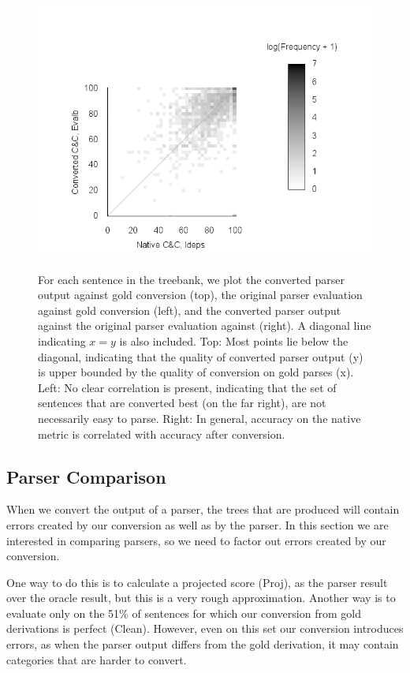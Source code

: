 \begin{figure}
{    \hfill
    \includegraphics[trim={15mm 0 65mm 40mm},clip]{figures/heat-both}
  }
	\caption[Heatmaps comparing gold conversion accuracy, \ccg native evaluation, and converted evaluation.]{ \label{fig:scatter_plots}
		For each sentence in the treebank, we plot the converted parser output against gold conversion (top), the original parser evaluation against gold conversion (left), and the converted parser output against the original parser evaluation against (right).
		A diagonal line indicating $x=y$ is also included.
		Top: Most points lie below the diagonal, indicating that the quality of converted parser output (y) is upper bounded by the quality of conversion on gold parses (x).
		Left: No clear correlation is present, indicating that the set of sentences that are converted best (on the far right), are not necessarily easy to parse.
		Right: In general, accuracy on the native metric is correlated with accuracy after conversion.
	}
\end{figure}

\subsection{Parser Comparison}

When we convert the output of a \ccg parser, the \ptb trees that are produced
will contain errors created by our conversion as well as by the parser. In this
section we are interested in comparing parsers, so we need to factor out errors
created by our conversion.

One way to do this is to calculate a projected score (Proj), as the
parser result over the oracle result, but this is a very rough approximation.
Another way is to evaluate only on the 51\% of sentences for which our
conversion from gold \ccg derivations is perfect (Clean).  However,
even on this set our conversion introduces errors, as when the parser output differs from the gold derivation, it may
contain categories that are harder to convert.

